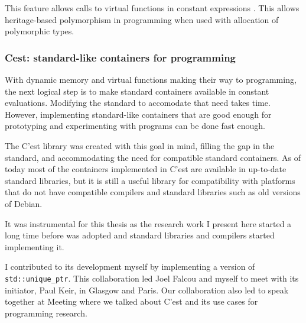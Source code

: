 \documentclass[../main]{subfiles}
\begin{document}
This feature allows calls to virtual functions in constant expressions
\cite{virtual-constexpr}. This allows heritage-based polymorphism in \constexpr
programming when used with \constexpr allocation of polymorphic types.

\subsubsection{
  Cest: standard-like containers for \constexpr programming
}

With dynamic memory and virtual functions making their way to
\constexpr programming, the next logical step is to make standard \cpp
containers available in constant evaluations.
Modifying the \cpp standard to accomodate that need takes time.
However, implementing standard-like containers that are good enough
for prototyping and experimenting with \constexpr programs
can be done fast enough.

The C'est \cite{cest} library was created with this goal in mind, filling the
gap in the \cpp standard, and accommodating the need for \constexpr compatible
standard containers.
As of today most of the containers implemented in C'est are available in
up-to-date standard libraries, but it is still a useful library for
compatibility with platforms that do not have  compatible compilers and
standard libraries such as old versions of Debian.

It was instrumental for this thesis as the research work I present here started
a long time before  was adopted and standard libraries and compilers
started implementing it.

I contributed to its development myself by implementing a \constexpr version
of \lstinline{std::unique_ptr}. This collaboration led Joel Falcou and myself to
meet with its initiator, Paul Keir, in Glasgow and Paris.
Our collaboration also led to speak together at
Meeting  \cite{meetingcpp22} where we talked about C'est and
its use cases for \constexpr programming research.


%
\end{document}
